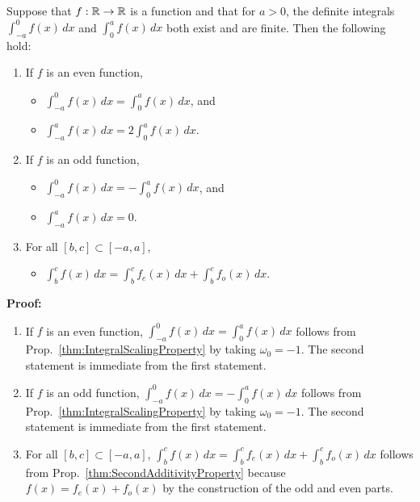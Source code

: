 \begin{tcolorbox}[title=\textcolor{black}{Proof of Prop.~\ref{thm:IntegralsEvenOddFunctions} (Integrals of Even and Odd Functions over Symmetric Intervals)}, sharp corners, colback=green!30, colframe=green!80!blue, breakable, fonttitle=\bfseries]

Suppose that $f:\mathbb R \to \mathbb R $ is a function and that for $a>0$, the definite integrals  $\int_{-a}^0 f(x) \,dx $ and  $\int_{0}^a f(x)\, dx $ both exist and are finite. Then the following hold:
\begin{enumerate}
\renewcommand{\labelenumi}{(\alph{enumi})}
\setlength{\itemsep}{.2cm}
     \item If $f$ is an even function, 
     \begin{itemize}
         \item  $\int_{-a}^0 f(x)\, dx = \int_{0}^a f(x)\, dx $, and 
         \item  $\int_{-a}^a f(x)\, dx = 2\int_{0}^a f(x)\, dx $.
     \end{itemize}
     \item If $f$ is an odd function, 
     \begin{itemize}
         \item  $\int_{-a}^0 f(x)\, dx = -\int_{0}^a f(x)\, dx $, and 
         \item  $\int_{-a}^a f(x)\, dx = 0$.
     \end{itemize}
     \item For all $[b, c] \subset [-a, a]$,
      \begin{itemize}
         \item  $\int_{b}^c f(x)\, dx = \int_b^c f_e(x)\, dx + \int_b^c f_o(x)\, dx$.
     \end{itemize}
     
      \end{enumerate}

\end{tcolorbox}

\bigskip
\textbf{Proof:} 

\begin{enumerate}
\renewcommand{\labelenumi}{(\alph{enumi})}
\setlength{\itemsep}{.2cm}
     \item If $f$ is an even function, $\int_{-a}^0 f(x)\, dx = \int_{0}^a f(x)\, dx $ follows from Prop.~\ref{thm:IntegralScalingProperty} by taking $\omega_0 = -1$. The second statement is immediate from the first statement.
     
     \item If $f$ is an odd function, $\int_{-a}^0 f(x)\, dx = -\int_{0}^a f(x)\, dx $  follows from Prop.~\ref{thm:IntegralScalingProperty} by taking $\omega_0 = -1$. The second statement is immediate from the first statement.
     
     \item For all $[b, c] \subset [-a, a]$, 
      $\int_{b}^c f(x)\, dx = \int_b^c f_e(x)\, dx + \int_b^c f_o(x)\, dx$
follows from Prop.~\ref{thm:SecondAdditivityProperty} because $f(x) = f_e(x) + f_o(x)$ by the construction of the odd and even parts.
     
      \end{enumerate}
      \Qed


